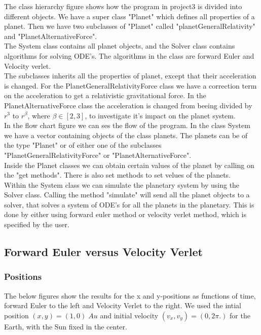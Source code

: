 \documentclass{article}
\begin{document}
The class hierarchy figure shows how the program in project3 is divided into different objects. We have a super class "Planet" which defines all properties of a planet. Then we have two subclasses of "Planet" called "planetGeneralRelativity" and "PlanetAlternativeForce".\\ 

The System class contains all planet objects, and the Solver class contains algorithms for solving ODE's. The algorithms in the class are forward Euler and Velocity verlet.\\

The subclasses inherits all the properties of planet, except that their acceleration is changed. For the PlanetGeneralRelativityForce class we have a correction term on the acceleration to get a relativistic gravitational force. In the PlanetAlternativeForce class the acceleration is changed from beeing divided by $r^3$ to $r^{\beta}$, where $\beta \in [2,3]$, to investigate it's impact on the planet system.\\  

In the flow chart figure we can ses the flow of the program. In the class System we have a vector containing objects of the class planets. The planets can be of the type "Planet" or of either one of the subclasses "PlanetGeneralRelativityForce" or "PlanetAlternativeForce".\\ 

Inside the Planet classes we can obtain certain values of the planet by calling on the "get methods". There is also set methods to set velues of the planets. \\

Within the System class we can simulate the planetary system by using the Solver class. Calling the method "simulate" will send all the planet objects to a solver, that solves a system of ODE's for all the planets in the planetary. This is done by either using forward euler method or velocity verlet method, which is specified by the user. 

\subsection{Forward Euler versus Velocity Verlet}

\subsubsection{Positions}
The below figures show the results for the x and y-positions as functions of time, forward Euler to the left and Velocity Verlet to the right. We used the intial position $(x,y) = (1,0)\;Au$ and initial velocity $(v_x, v_y) = (0, 2\pi.)$ for the Earth, with the Sun fixed in the center.
\end{document}
